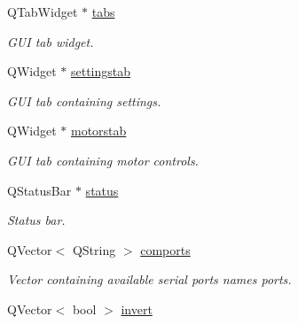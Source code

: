 \begin{DoxyCompactItemize}
\mbox{\label{classcagecontrol_abc80d835c69ca52a62f18c341c2bd009}} 
Q\+Tab\+Widget $\ast$ \hyperlink{classcagecontrol_abc80d835c69ca52a62f18c341c2bd009}{tabs}
\begin{DoxyCompactList}\small\item\em G\+UI tab widget. \end{DoxyCompactList}\item 
\mbox{\label{classcagecontrol_a5350ebcf40a0c709af82276e6ce2284d}} 
Q\+Widget $\ast$ \hyperlink{classcagecontrol_a5350ebcf40a0c709af82276e6ce2284d}{settingstab}
\begin{DoxyCompactList}\small\item\em G\+UI tab containing settings. \end{DoxyCompactList}\item 
\mbox{\label{classcagecontrol_a9c0bb2384100cced3b96363cca8e5428}} 
Q\+Widget $\ast$ \hyperlink{classcagecontrol_a9c0bb2384100cced3b96363cca8e5428}{motorstab}
\begin{DoxyCompactList}\small\item\em G\+UI tab containing motor controls. \end{DoxyCompactList}\item 
\mbox{\label{classcagecontrol_a18d5a48b8893f88b9b660c9c08e92f9b}} 
Q\+Status\+Bar $\ast$ \hyperlink{classcagecontrol_a18d5a48b8893f88b9b660c9c08e92f9b}{status}
\begin{DoxyCompactList}\small\item\em Status bar. \end{DoxyCompactList}\item 
\mbox{\label{classcagecontrol_a1fa2f1480f616b4f7142f9e7a471cef3}} 
Q\+Vector$<$ Q\+String $>$ \hyperlink{classcagecontrol_a1fa2f1480f616b4f7142f9e7a471cef3}{comports}
\begin{DoxyCompactList}\small\item\em Vector containing available serial ports names ports. \end{DoxyCompactList}\item 
\mbox{\label{classcagecontrol_a3a78cb0c0f45a8bb3e6b093ef7412124}} 
Q\+Vector$<$ bool $>$ \hyperlink{classcagecontrol_a3a78cb0c0f45a8bb3e6b093ef7412124}{invert}

\end{DoxyCompactItemize}
